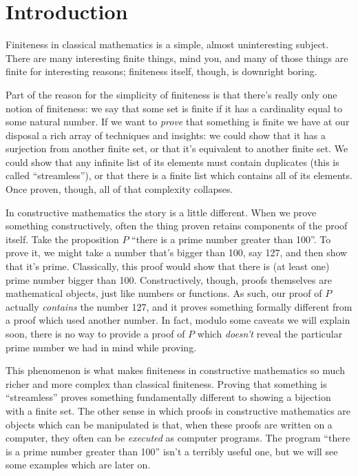 \chapter{Introduction}
Finiteness in classical mathematics is a simple, almost uninteresting subject.
There are many interesting finite things, mind you, and many of those things are
finite for interesting reasons; finiteness itself, though, is downright boring.

Part of the reason for the simplicity of finiteness is that there's really only
one notion of finiteness: we say that some set is finite if it has a cardinality
equal to some natural number.
If we want to \emph{prove} that something is finite we have at our disposal a
rich array of techniques and insights: we could show that it has a surjection
from another finite set, or that it's equivalent to another finite set.
We could show that any infinite list of its elements must contain duplicates
(this is called ``streamless''), or that there is a finite list which contains
all of its elements.
Once proven, though, all of that complexity collapses.

In constructive mathematics the story is a little different.
When we prove something constructively, often the thing proven retains
components of the proof itself.
Take the proposition \(P\) ``there is a prime number greater than 100''.
To prove it, we might take a number that's bigger than 100, say 127, and then
show that it's prime.
Classically, this proof would show that there is (at least one) prime number
bigger than 100.
Constructively, though, proofs themselves are mathematical objects, just like
numbers or functions.
As such, our proof of \(P\) actually \emph{contains} the number 127, and it proves
something formally different from a proof which used another number.
In fact, modulo some caveats we will explain soon, there is no way to provide a
proof of \(P\) which \emph{doesn't} reveal the particular prime number we had in
mind while proving.

This phenomenon is what makes finiteness in constructive mathematics so much
richer and more complex than classical finiteness.
Proving that something is ``streamless'' proves something fundamentally
different to showing a bijection with a finite set.
The other sense in which proofs in constructive mathematics are objects which
can be manipulated is that, when these proofs are written on a computer, they
often can be \emph{executed} as computer programs.
The program ``there is a prime number greater than 100'' isn't a terribly useful
one, but we will see some examples which are later on.

